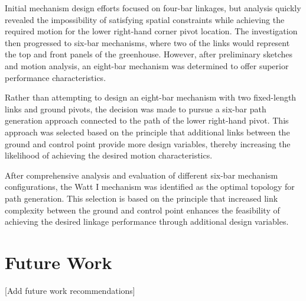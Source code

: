 \documentclass[12pt]{article}
\begin{document}
Initial mechanism design efforts focused on four-bar linkages, but analysis quickly revealed the impossibility of satisfying spatial constraints while achieving the required motion for the lower right-hand corner pivot location. The investigation then progressed to six-bar mechanisms, where two of the links would represent the top and front panels of the greenhouse. However, after preliminary sketches and motion analysis, an eight-bar mechanism was determined to offer superior performance characteristics.

Rather than attempting to design an eight-bar mechanism with two fixed-length links and ground pivots, the decision was made to pursue a six-bar path generation approach connected to the path of the lower right-hand pivot. This approach was selected based on the principle that additional links between the ground and control point provide more design variables, thereby increasing the likelihood of achieving the desired motion characteristics.

After comprehensive analysis and evaluation of different six-bar mechanism configurations, the Watt I mechanism was identified as the optimal topology for path generation. This selection is based on the principle that increased link complexity between the ground and control point enhances the feasibility of achieving the desired linkage performance through additional design variables.

\section{Future Work}
\label{sec:future}

[Add future work recommendations]




\cite{Bom1978}
\cite{Jaderloon1999}
\cite{Koziol1974}

\appendix
\end{document}
